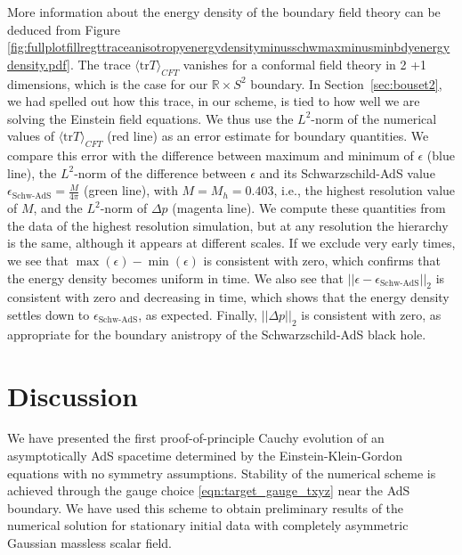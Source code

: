 \documentclass[a4paper,11pt]{article}
\numberwithin{equation}{section}
\begin{document}
More information about the energy density of the boundary field theory can be deduced from Figure \ref{fig:fullplotfillregttraceanisotropyenergydensityminusschwmaxminusminbdyenergydensity.pdf}. 
The trace $\langle \text{tr}T\rangle_{CFT}$ vanishes for a conformal field theory in 2 +1 dimensions, which is the case for our $\mathbb{R} \times S^2$ boundary.
In Section~\ref{sec:bouset2}, we had spelled out how this trace, in our scheme, is tied to how well we are solving the Einstein field equations.
We thus use the $L^2$-norm of the numerical values of $\langle \text{tr}T\rangle_{CFT}$ (red line) as an error estimate for boundary quantities. We compare this error with the difference between maximum and minimum of $\epsilon$ (blue line), the $L^2$-norm of the difference between $\epsilon$ and its Schwarzschild-AdS value $\epsilon_{\text{Schw-AdS}}=\frac{M}{4\pi}$ (green line), with $M=M_h=0.403$, i.e., the highest resolution value of $M$, and the $L^2$-norm of $\Delta p$ (magenta line). We compute these quantities from the data of the highest resolution simulation, but at any resolution the hierarchy is the same, although it appears at different scales.
If we exclude very early times, we see that $\max(\epsilon)-\min(\epsilon)$ is consistent with zero, which confirms that the energy density becomes uniform in time.
We also see that $||\epsilon-\epsilon_{\text{Schw-AdS}}||_2$ is consistent with zero and decreasing in time, which shows that the energy density settles down to $\epsilon_{\text{Schw-AdS}}$, as expected.
Finally, $||\Delta p||_2$ is consistent with zero, as appropriate for the boundary anistropy of the Schwarzschild-AdS black hole.



\section{Discussion}\label{sec:Discussion}

We have presented the first proof-of-principle Cauchy evolution of an asymptotically AdS spacetime determined by the Einstein-Klein-Gordon equations with no symmetry assumptions. Stability of the numerical scheme is achieved through the gauge choice \eqref{eqn:target_gauge_txyz} near the AdS boundary. 
We have used this scheme to obtain preliminary results of the numerical solution for stationary initial data with completely asymmetric Gaussian massless scalar field.
\end{document}

